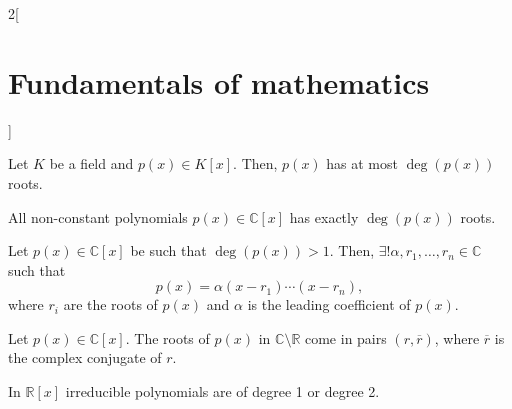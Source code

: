\documentclass[../../../main.tex]{subfiles}
\begin{document}
\begin{multicols}{2}[\section{Fundamentals of mathematics}]
    \begin{theorem}
        Let $K$ be a field and $p(x)\in K[x]$. Then, $p(x)$ has at most $\deg(p(x))$ roots.
    \end{theorem}
    \begin{theorem}
        All non-constant polynomials $p(x)\in\mathbb{C}[x]$ has exactly $\deg(p(x))$ roots.
    \end{theorem}
    \begin{corollary}
        Let $p(x)\in\mathbb{C}[x]$ be such that $\deg(p(x))>1$. Then, $\exists!\alpha,r_1,\ldots,r_n\in\mathbb{C}$ such that $$p(x)=\alpha(x-r_1)\cdots(x-r_n),$$ where $r_i$ are the roots of $p(x)$ and $\alpha$ is the leading coefficient of $p(x)$.
    \end{corollary}
    \begin{corollary}
        Let $p(x)\in\mathbb{C}[x]$. The roots of $p(x)$ in $\mathbb{C}\setminus\mathbb{R}$ come in pairs $(r,\overline{r})$, where $\overline{r}$ is the complex conjugate of $r$.
    \end{corollary}
    \begin{theorem}
        In $\mathbb{R}[x]$ irreducible polynomials are of degree 1 or degree 2.
    \end{theorem}
\end{multicols}
\end{document}
